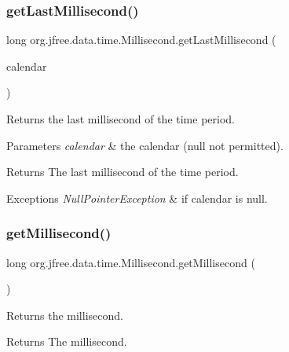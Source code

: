\subsubsection{\texorpdfstring{get\+Last\+Millisecond()}{getLastMillisecond()}\hspace{0.1cm}{\footnotesize\ttfamily [2/2]}}
{\footnotesize\ttfamily long org.\+jfree.\+data.\+time.\+Millisecond.\+get\+Last\+Millisecond (\begin{DoxyParamCaption}\item[{Calendar}]{calendar }\end{DoxyParamCaption})}

Returns the last millisecond of the time period.


\begin{DoxyParams}{Parameters}
{\em calendar} & the calendar ({\ttfamily null} not permitted).\\
\hline
\end{DoxyParams}
\begin{DoxyReturn}{Returns}
The last millisecond of the time period.
\end{DoxyReturn}

\begin{DoxyExceptions}{Exceptions}
{\em Null\+Pointer\+Exception} & if {\ttfamily calendar} is {\ttfamily null}. \\
\hline
\end{DoxyExceptions}
\mbox{\label{classorg_1_1jfree_1_1data_1_1time_1_1_millisecond_a49c4898f0ef6dda4c34af9752ad93097}} 
\subsubsection{\texorpdfstring{get\+Millisecond()}{getMillisecond()}}
{\footnotesize\ttfamily long org.\+jfree.\+data.\+time.\+Millisecond.\+get\+Millisecond (\begin{DoxyParamCaption}{ }\end{DoxyParamCaption})}

Returns the millisecond.

\begin{DoxyReturn}{Returns}
The millisecond. 
\end{DoxyReturn}
\mbox{\label{classorg_1_1jfree_1_1data_1_1time_1_1_millisecond_ab8bececee0a01fcdfea0c7b1e76ee4ba}} 
